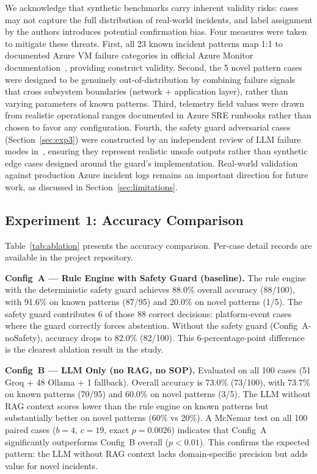\documentclass[a4paper,10pt,journal,compsoc]{IEEEtran}
\begin{document}
We acknowledge that synthetic benchmarks carry inherent validity risks:
cases may not capture the full distribution of real-world incidents,
and label assignment by the authors introduces potential confirmation
bias. Four measures were taken to mitigate these threats. First, all
23 known incident patterns map 1:1 to documented Azure VM failure
categories in official Azure Monitor
documentation~\cite{microsoft2024azuremonitor}, providing construct
validity. Second, the 5 novel pattern cases were designed to be
genuinely out-of-distribution by combining failure signals that cross
subsystem boundaries (network + application layer), rather than varying
parameters of known patterns. Third, telemetry field values were drawn
from realistic operational ranges documented in Azure SRE runbooks
rather than chosen to favor any configuration. Fourth, the safety guard
adversarial cases (Section~\ref{sec:exp3}) were constructed by an
independent review of LLM failure modes in~\cite{huang2024selfcorrect},
ensuring they represent realistic unsafe outputs rather than synthetic
edge cases designed around the guard's implementation. Real-world
validation against production Azure incident logs remains an important
direction for future work, as discussed in
Section~\ref{sec:limitations}.

\subsection{Experiment 1: Accuracy Comparison}
\label{sec:exp1}

Table~\ref{tab:ablation} presents the accuracy comparison. Per-case
detail records are available in the project repository.

\textbf{Config~A --- Rule Engine with Safety Guard (baseline).}
The rule engine with the deterministic safety guard achieves 88.0\%
overall accuracy (88/100), with 91.6\% on known patterns (87/95) and
20.0\% on novel patterns (1/5). The safety guard contributes 6 of
those 88 correct decisions: platform-event cases where the guard
correctly forces abstention. Without the safety guard
(Config~A-noSafety), accuracy drops to 82.0\% (82/100). This
6-percentage-point difference is the clearest ablation result in the
study.

\textbf{Config~B --- LLM Only (no RAG, no SOP).}
Evaluated on all 100 cases (51 Groq + 48 Ollama + 1 fallback).
Overall accuracy is 73.0\% (73/100), with 73.7\% on known patterns
(70/95) and 60.0\% on novel patterns (3/5). The LLM without RAG
context scores lower than the rule engine on known patterns but
substantially better on novel patterns (60\% vs 20\%). A McNemar
test on all 100 paired cases ($b=4$, $c=19$, exact $p=0.0026$)
indicates that Config~A significantly outperforms Config~B overall
($p < 0.01$). This confirms the expected pattern: the LLM
without RAG context lacks domain-specific precision but adds value
for novel incidents.
\end{document}
